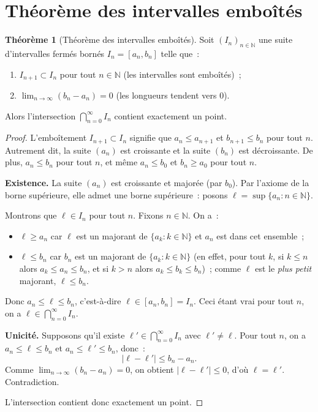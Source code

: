\documentclass[12pt,a4paper,openany]{book}
\theoremstyle{definition}
\newtheorem{theoreme}{Théorème}[chapter]
\newcommand{\N}{\mathbb{N}}
\newcommand{\abs}[1]{\left\lvert #1 \right\rvert}
\begin{document}
\section{Théorème des intervalles emboîtés}
\label{sec:intervalles-emboites}

\begin{theoreme}[Théorème des intervalles emboîtés]\label{thm:intervalles-emboites}
  Soit $(I_n)_{n \in \N}$ une suite d'intervalles fermés bornés $I_n = [a_n, b_n]$ telle que~:
  \begin{enumerate}[label=(\roman*)]
    \item $I_{n+1} \subset I_n$ pour tout $n \in \N$ (les intervalles sont emboîtés)~;
    \item $\lim_{n \to \infty} (b_n - a_n) = 0$ (les longueurs tendent vers $0$).
  \end{enumerate}
  Alors l'intersection $\displaystyle\bigcap_{n=0}^{\infty} I_n$ contient exactement un point.
\end{theoreme}

\begin{proof}
  L'emboîtement $I_{n+1} \subset I_n$ signifie que $a_n \leq a_{n+1}$ et $b_{n+1} \leq b_n$ pour tout $n$. Autrement dit, la suite $(a_n)$ est croissante et la suite $(b_n)$ est décroissante. De plus, $a_n \leq b_n$ pour tout $n$, et même $a_n \leq b_0$ et $b_n \geq a_0$ pour tout $n$.

  \textbf{Existence.} La suite $(a_n)$ est croissante et majorée (par $b_0$). Par l'axiome de la borne supérieure, elle admet une borne supérieure~: posons $\ell = \sup\{a_n : n \in \N\}$.

  Montrons que $\ell \in I_n$ pour tout $n$. Fixons $n \in \N$. On a~:
  \begin{itemize}
    \item $\ell \geq a_n$ car $\ell$ est un majorant de $\{a_k : k \in \N\}$ et $a_n$ est dans cet ensemble~;
    \item $\ell \leq b_n$ car $b_n$ est un majorant de $\{a_k : k \in \N\}$ (en effet, pour tout $k$, si $k \leq n$ alors $a_k \leq a_n \leq b_n$, et si $k > n$ alors $a_k \leq b_k \leq b_n$)~; comme $\ell$ est le \emph{plus petit} majorant, $\ell \leq b_n$.
  \end{itemize}
  Donc $a_n \leq \ell \leq b_n$, c'est-à-dire $\ell \in [a_n, b_n] = I_n$. Ceci étant vrai pour tout $n$, on a $\ell \in \bigcap_{n=0}^{\infty} I_n$.

  \textbf{Unicité.} Supposons qu'il existe $\ell' \in \bigcap_{n=0}^{\infty} I_n$ avec $\ell' \neq \ell$. Pour tout $n$, on a $a_n \leq \ell \leq b_n$ et $a_n \leq \ell' \leq b_n$, donc~:
  \[
    \abs{\ell - \ell'} \leq b_n - a_n.
  \]
  Comme $\lim_{n \to \infty}(b_n - a_n) = 0$, on obtient $\abs{\ell - \ell'} \leq 0$, d'où $\ell = \ell'$. Contradiction.

  L'intersection contient donc exactement un point.
\end{proof}
\end{document}
